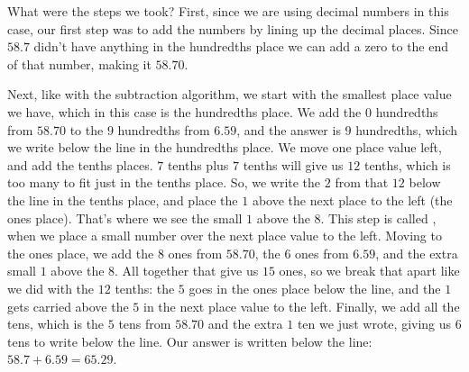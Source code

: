 \documentclass{ximera}
\begin{document}
\begin{center}  \end{center}

What were the steps we took? First, since we are using decimal numbers in this case, our first step was to add the numbers by lining up the decimal places. Since $58.7$ didn't have anything in the hundredths place we can add a zero to the end of that number, making it $58.70$.

Next, like with the subtraction algorithm, we start with the smallest place value we have, which in this case is the hundredths place. We add the $0$ hundredths from $58.70$ to the $9$ hundredths from $6.59$, and the answer is $9$ hundredths, which we write below the line in the hundredths place. We move one place value left, and add the tenths places. $7$ tenths plus $7$ tenths will give us $12$ tenths, which is too many to fit just in the tenths place. So, we write the $2$ from that $12$ below the line in the tenths place, and place the $1$ above the next place to the left (the ones place). That's where we see the small $1$ above the $8$. This step is called , when we place a small number over the next place value to the left. Moving to the ones place, we add the $8$ ones from $58.70$, the $6$ ones from $6.59$, and the extra small $1$ above the $8$. All together that give us $15$ ones, so we break that apart like we did with the $12$ tenths: the $5$ goes in the ones place below the line, and the $1$ gets carried above the $5$ in the next place value to the left. Finally, we add all the tens, which is the $5$ tens from $58.70$ and the extra $1$ ten we just wrote, giving us $6$ tens to write below the line. Our answer is written below the line: $58.7+6.59=65.29$.
\end{document}

